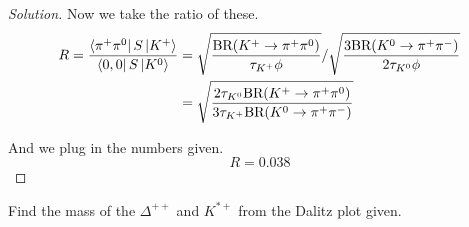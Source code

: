 \documentclass[12pt]{article}
\newenvironment{question}[2][Question]{\begin{trivlist}
\item[\hskip \labelsep {\bfseries #1}\hskip \labelsep {\bfseries #2.}]}{\end{trivlist}}
\newenvironment{solution}{\begin{proof}[Solution]}{\end{proof}}
\begin{document}
\begin{solution}
Now we take the ratio of these.
\begin{align*}
    R=\frac{\bra{\pi^+\pi^0}S\ket{K^+}}{\bra{0,0}S\ket{K^0}}&=\sqrt{\frac{\text{BR}(K^+\rightarrow\pi^+\pi^0)}{\tau_{K^+}\phi}}/\sqrt{\frac{3\text{BR}(K^0\rightarrow\pi^+\pi^-)}{2\tau_{K^0}\phi}} \\
    &= \sqrt{\frac{2\tau_{K^0}\text{BR}(K^+\rightarrow\pi^+\pi^0)}{3\tau_{K^+}\text{BR}(K^0\rightarrow\pi^+\pi^-)}}
\end{align*}

And we plug in the numbers given.
\begin{equation*}
    \boxed{R=0.038}
\end{equation*}

\end{solution}

\newpage

\begin{question}{21.2}
Find the mass of the $\Delta^{++}$ and $K^{*+}$ from the Dalitz plot given.
\end{question}
\end{document}
